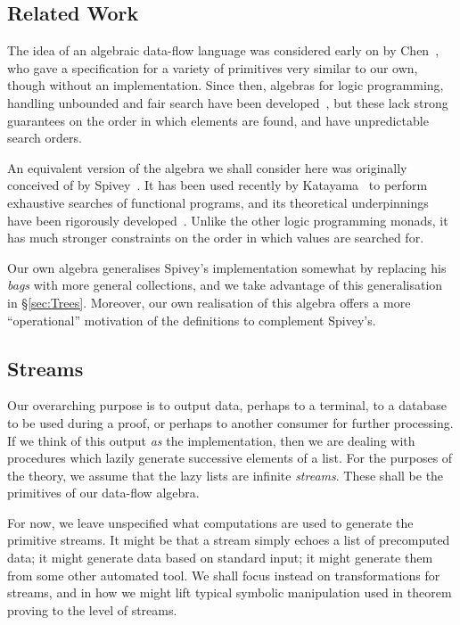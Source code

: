 \subsection{Related Work}
The idea of an algebraic data-flow language was considered early on by Chen~\cite{ChenForwardChaining}, who gave a specification for a variety of primitives very similar to our own, though without an implementation. Since then, algebras for logic programming, handling unbounded and fair search have been developed~\cite{BacktrackingMonad,Omega}, but these lack strong guarantees on the order in which elements are found, and have unpredictable search orders.

An equivalent version of the algebra we shall consider here was originally conceived of by Spivey~\cite{SpiveyBreadthFirst}. It has been used recently by Katayama~\cite{ImprovementsMagickHaskeller} to perform exhaustive searches of functional programs, and its theoretical underpinnings have been rigorously developed~\cite{SearchAlgebras}. Unlike the other logic programming monads, it has much stronger constraints on the order in which values are searched for. 

Our own algebra generalises Spivey's implementation somewhat by replacing his \emph{bags} with more general collections, and we take advantage of this generalisation in \S\ref{sec:Trees}. Moreover, our own realisation of this algebra offers a more ``operational'' motivation of the definitions to complement Spivey's.

\subsection{Streams}\label{sec:Streams}
Our overarching purpose is to output data, perhaps to a terminal, to a database to be used during a proof, or perhaps to another consumer for further processing. If we think of this output \emph{as} the implementation, then we are dealing with procedures which lazily generate successive elements of a list. For the purposes of the theory, we assume that the lazy lists are infinite \emph{streams}. These shall be the primitives of our data-flow algebra.

For now, we leave unspecified what computations are used to generate the primitive streams. It might be that a stream simply echoes a list of precomputed data; it might generate data based on standard input; it might generate them from some other automated tool. We shall focus instead on transformations for streams, and in how we might lift typical symbolic manipulation used in theorem proving to the level of streams.

